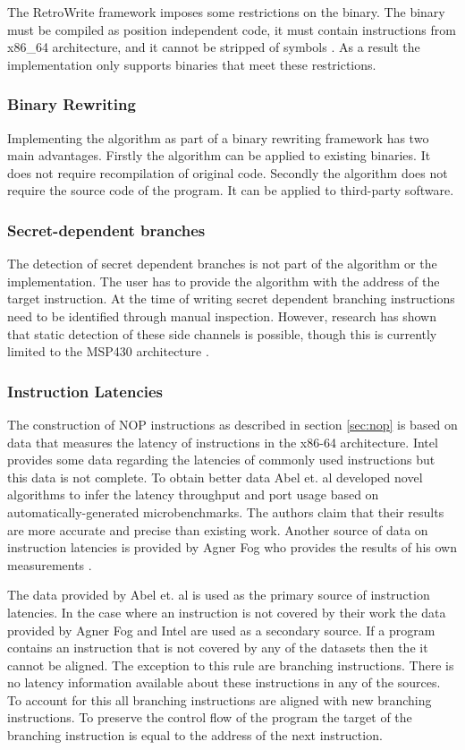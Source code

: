 The RetroWrite framework imposes some restrictions on the binary. The binary must be compiled as position independent code, it must contain instructions from x86\_64 architecture, and 
it cannot be stripped of symbols \cite{hexhive}. 
As a result the implementation only supports binaries that meet these restrictions. 

\subsubsection{Binary Rewriting}
Implementing the algorithm as part of a binary rewriting framework has two main advantages. 
Firstly the algorithm can be applied to existing binaries. It does not require recompilation of original code.
Secondly the algorithm does not require the source code of the program. It can be applied to third-party software. 


\subsubsection{Secret-dependent branches}
The detection of secret dependent branches is not part of the algorithm or the implementation. The user has to provide the algorithm with the address of the target instruction. 
At the time of writing secret dependent branching instructions need to be identified through manual inspection. However, research has shown that static detection of these side channels is possible, though 
this is currently limited to the MSP430 architecture \cite{MSP430Detection}.

\subsubsection{Instruction Latencies}
The construction of NOP instructions as described in section \ref{sec:nop} is based on data that measures the latency of instructions in the x86-64 architecture.
Intel provides some data regarding the latencies of commonly used instructions \cite{intel-ref-manual} but this data is not complete.
To obtain better data Abel et. al  \cite{uops} developed novel algorithms to infer the latency throughput and port usage based on automatically-generated microbenchmarks. 
The authors claim that their results are more accurate and precise than existing work. 
Another source of data on instruction latencies is provided by Agner Fog who provides the results of his own measurements \cite{fog_2021}. 

The data provided by Abel et. al is  used as the primary source of instruction latencies. In the case where an instruction is not covered by their work the data 
provided by Agner Fog and Intel are used as a secondary source. If a program contains an instruction that is not covered by any of the datasets then the it cannot
be aligned. The exception to this rule are branching instructions. There is no latency information available about these instructions in any of the sources. 
To account for this  all branching instructions are aligned with new branching instructions. To preserve the control flow of the program the target of 
the branching instruction is equal to the address of the next instruction. 
